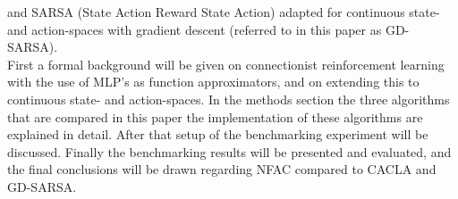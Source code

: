 \cite{van2007reinforcement}
and SARSA (State Action Reward State Action) adapted for continuous state- and action-spaces \cite{nichols2014application} with gradient descent (referred to in this paper as GD-SARSA). \\
First a formal background will be given on connectionist reinforcement learning with the use of MLP's as function approximators,
and on extending this to continuous state- and action-spaces. In the methods section the three algorithms that are compared
 in this paper the implementation of these algorithms are explained in detail. After that setup of the benchmarking experiment will be discussed.
Finally the benchmarking results will be presented and evaluated, and the final conclusions will be drawn regarding NFAC compared to CACLA and GD-SARSA.
